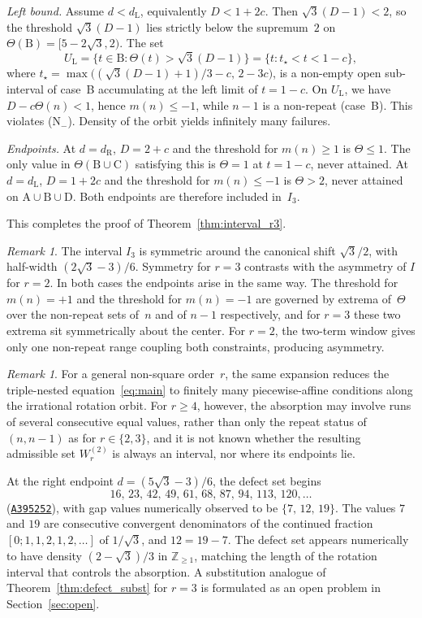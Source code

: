 \documentclass{birkjour}
\theoremstyle{definition}
\theoremstyle{remark}
\newtheorem{remark}[theorem]{Remark}
\begin{document}
\emph{Left bound.} Assume $d<d_{\mathrm{L}}$, equivalently
$D<1+2c$. Then $\sqrt{3}(D-1)<2$, so the threshold
$\sqrt{3}(D-1)$ lies strictly below the supremum~$2$
on $\Theta(\mathrm{B})=[5-2\sqrt{3},2)$. The set
\[
  U_{\mathrm{L}}=\{t\in\mathrm{B}:\Theta(t)>\sqrt{3}(D-1)\}
       =\{t:t_{\star}<t<1-c\},
\]
where
$t_{\star}=\max\bigl((\sqrt{3}(D-1)+1)/3-c,\,2-3c\bigr)$,
is a non-empty open sub-interval of case~B
accumulating at the left limit of $t=1-c$. On
$U_{\mathrm{L}}$, we have $D-c\Theta(n)<1$, hence $m(n)\le -1$,
while $n-1$ is a non-repeat (case~B). This violates
(N$_{-}$). Density of the orbit yields infinitely
many failures.

\emph{Endpoints.} At $d=d_{\mathrm{R}}$, $D=2+c$ and the
threshold for $m(n)\ge 1$ is $\Theta\le 1$. The only
value in $\Theta(\mathrm{B}\cup\mathrm{C})$ satisfying this
is $\Theta=1$ at $t=1-c$, never attained. At
$d=d_{\mathrm{L}}$, $D=1+2c$ and the threshold for
$m(n)\le -1$ is $\Theta>2$, never attained on
$\mathrm{A}\cup\mathrm{B}\cup\mathrm{D}$. Both endpoints
are therefore included in~$I_{3}$.

This completes the proof of
Theorem~\ref{thm:interval_r3}.

\begin{remark}
The interval $I_{3}$ is symmetric around the
canonical shift $\sqrt{3}/2$, with half-width
$(2\sqrt{3}-3)/6$. Symmetry for $r=3$ contrasts
with the asymmetry of $I$ for $r=2$. In both cases
the endpoints arise in the same way. The threshold for
$m(n)=+1$ and the threshold for $m(n)=-1$ are
governed by extrema of~$\Theta$ over the non-repeat
sets of~$n$ and of $n-1$ respectively, and for $r=3$
these two extrema sit symmetrically about the center.
For $r=2$, the two-term window gives only one
non-repeat range coupling both constraints,
producing asymmetry.
\end{remark}

\begin{remark}
For a general non-square order~$r$, the same expansion reduces
the triple-nested equation~\eqref{eq:main} to finitely many
piecewise-affine conditions along the irrational rotation
orbit. For $r\ge 4$, however, the absorption may involve runs
of several consecutive equal values, rather than only the
repeat status of $(n,n-1)$ as for $r\in\{2,3\}$, and it is not
known whether the resulting admissible set $W_{r}^{(2)}$ is
always an interval, nor where its endpoints lie.
\end{remark}

At the right endpoint $d=(5\sqrt{3}{-}3)/6$,
the defect set begins
\[
  16,\,23,\,42,\,49,\,61,\,68,\,87,\,94,\,
  113,\,120,\ldots
\]
(\href{https://oeis.org/A395252}{\texttt{A395252}}),
with gap values numerically observed to be
$\{7,\,12,\,19\}$. The values $7$ and $19$ are consecutive
convergent denominators of the continued fraction
$[0;1,1,2,1,2,\ldots]$ of $1/\!\sqrt{3}$, and $12=19-7$. The defect set
appears numerically to have density $(2{-}\sqrt{3})/3$ in
$\mathbb{Z}_{\ge 1}$, matching the length of the rotation
interval that controls the absorption. A substitution
analogue of
Theorem~\ref{thm:defect_subst} for $r=3$ is formulated as an
open problem in Section~\ref{sec:open}.
\end{document}
